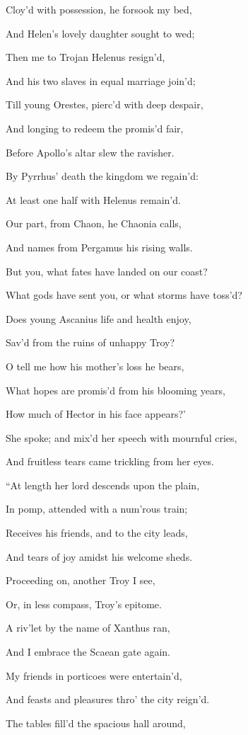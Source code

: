 Cloy’d with possession, he forsook my bed,

And Helen’s lovely daughter sought to wed;

Then me to Trojan Helenus resign’d,

And his two slaves in equal marriage join’d;

Till young Orestes, pierc’d with deep despair,

And longing to redeem the promis’d fair,

Before Apollo’s altar slew the ravisher.

By Pyrrhus’ death the kingdom we regain’d:

At least one half with Helenus remain’d.

Our part, from Chaon, he Chaonia calls,

And names from Pergamus his rising walls.

But you, what fates have landed on our coast?

What gods have sent you, or what storms have toss’d?

Does young Ascanius life and health enjoy,

Sav’d from the ruins of unhappy Troy?

O tell me how his mother’s loss he bears,

What hopes are promis’d from his blooming years,

How much of Hector in his face appears?’

She spoke; and mix’d her speech with mournful cries,

And fruitless tears came trickling from her eyes.

“At length her lord descends upon the plain,

In pomp, attended with a num’rous train;

Receives his friends, and to the city leads,

And tears of joy amidst his welcome sheds.

Proceeding on, another Troy I see,

Or, in less compass, Troy’s epitome.

A riv’let by the name of Xanthus ran,

And I embrace the Scaean gate again.

My friends in porticoes were entertain’d,

And feasts and pleasures thro’ the city reign’d.

The tables fill’d the spacious hall around,

